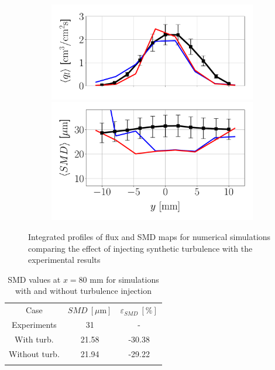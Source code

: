 \begin{figure}[h!]
\begin{subfigure}[b]{0.4\textwidth}
	\flushleft
   \includegraphics[scale=0.35]{./part2_developments/figures_ch6_lagrangian_JICF/params_turb_injection/profiles/flux_along_y}\\
   \vspace{-0.16in}
   \includegraphics[scale=0.35]{./part2_developments/figures_ch6_lagrangian_JICF/params_turb_injection/profiles/SMD_along_y}
\end{subfigure}

\caption{Integrated profiles of flux and SMD maps for numerical simulations comparing the effect of injecting synthetic turbulence with the experimental results}
\label{fig:profiles_LGS_JICF_turbulence_injection}
\end{figure}

\begin{table}[!h]
\centering
\caption{SMD values at $x = 80$ mm for simulations with and without turbulence injection}
\begin{tabular}{ccc}
\thickhline
Case & $SMD~\left[\mu \mathrm{m} \right]$ & $\varepsilon_{SMD}~\left[\% \right]$ \\
\thickhline
Experiments & 31 & - \\
With turb. & 21.58 & -30.38 \\
Without turb. & 21.94 & -29.22 \\
\thickhline
\end{tabular}
\label{tab:SMD_deviations_turb_inj}
\end{table}

